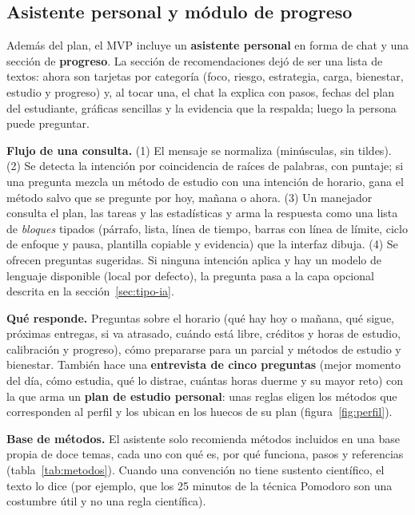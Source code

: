 \subsection{Asistente personal y módulo de progreso}\label{sec:asistente}

Además del plan, el MVP incluye un \textbf{asistente personal} en forma de chat y una sección de \textbf{progreso}. La sección de recomendaciones dejó de ser una lista de textos: ahora son tarjetas por categoría (foco, riesgo, estrategia, carga, bienestar, estudio y progreso) y, al tocar una, el chat la explica con pasos, fechas del plan del estudiante, gráficas sencillas y la evidencia que la respalda; luego la persona puede preguntar.

\textbf{Flujo de una consulta.} (1) El mensaje se normaliza (minúsculas, sin tildes). (2) Se detecta la intención por coincidencia de raíces de palabras, con puntaje; si una pregunta mezcla un método de estudio con una intención de horario, gana el método salvo que se pregunte por hoy, mañana o ahora. (3) Un manejador consulta el plan, las tareas y las estadísticas y arma la respuesta como una lista de \emph{bloques} tipados (párrafo, lista, línea de tiempo, barras con línea de límite, ciclo de enfoque y pausa, plantilla copiable y evidencia) que la interfaz dibuja. (4) Se ofrecen preguntas sugeridas. Si ninguna intención aplica y hay un modelo de lenguaje disponible (local por defecto), la pregunta pasa a la capa opcional descrita en la sección~\ref{sec:tipo-ia}.

\textbf{Qué responde.} Preguntas sobre el horario (qué hay hoy o mañana, qué sigue, próximas entregas, si va atrasado, cuándo está libre, créditos y horas de estudio, calibración y progreso), cómo prepararse para un parcial y métodos de estudio y bienestar. También hace una \textbf{entrevista de cinco preguntas} (mejor momento del día, cómo estudia, qué lo distrae, cuántas horas duerme y su mayor reto) con la que arma un \textbf{plan de estudio personal}: unas reglas eligen los métodos que corresponden al perfil y los ubican en los huecos de su plan (figura~\ref{fig:perfil}).

\textbf{Base de métodos.} El asistente solo recomienda métodos incluidos en una base propia de doce temas, cada uno con qué es, por qué funciona, pasos y referencias (tabla~\ref{tab:metodos}). Cuando una convención no tiene sustento científico, el texto lo dice (por ejemplo, que los 25 minutos de la técnica Pomodoro son una costumbre útil y no una regla científica).

